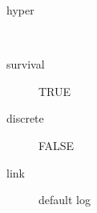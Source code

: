 \begin{description}
	\item[hyper]\ 
	 \item[ survival ] TRUE 
	 \item[ discrete ] FALSE 
	 \item[ link ] default log 
\end{description}
